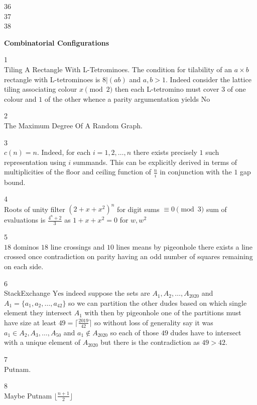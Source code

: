36 \\


37 \\


38 \\


\newpage

\textbf{Combinatorial Configurations}

1 \\
Tiling A Rectangle With L-Tetrominoes. The condition for tilability of an $a \times b$ rectangle with L-tetrominoes is $8|(ab)$ and $a,b>1$. Indeed consider the lattice tiling associating colour $x \pmod{2}$ then each L-tetromino must cover $3$ of one colour and $1$ of the other whence a parity argumentation yields $\boxed{\text{No}}$

2 \\
The Maximum Degree Of A Random Graph.

3 \\
$\boxed{c(n)=n}$. Indeed, for each $i=1,2,\dots,n$ there exists precisely $1$ such representation using $i$ summands. This can be explicitly derived in terms of multiplicities of the floor and ceiling function of $\frac{n}{i}$ in conjunction with the $1$ gap bound.

4 \\
Roots of unity filter $(2+x+x^2)^n$ for digit sums $\equiv 0 \pmod{3}$ sum of evaluations is $\boxed{\frac{4^n+2}{3}}$ as $1+x+x^2=0$ for $w,w^2$

5 \\
$18$ dominos $18$ line crossings and $10$ lines means by pigeonhole there exists a line crossed once contradiction on parity having an odd number of squares remaining on each side.

6 \\
StackExchange $\boxed{\text{Yes}}$ indeed suppose the sets are $A_1,A_2,\dots,A_{2020}$ and $A_1=\{a_1,a_2,\dots,a_{42} \}$ so we can partition the other dudes based on which single element they intersect $A_1$ with then by pigeonhole one of the partitions must have size at least $49=\lceil \frac{2019}{42} \rceil$ so without loss of generality say it was $a_1 \in A_2,A_3,\dots,A_{50}$ and $a_1 \notin A_{2020}$ so each of those $49$ dudes have to intersect with a unique element of $A_{2020}$ but there is the contradiction as $49>42$.

7 \\
Putnam.

8 \\
Maybe Putnam $\boxed{\lfloor \frac{n+1}{2} \rfloor}$

